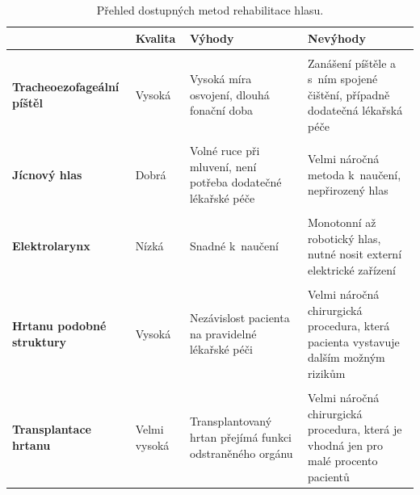 \newcolumntype{b}{X}

\begin{table}[ht]
  \centering
  \begin{tabularx}{1.0\textwidth}{L{1.2} L{0.6} L{1.1} L{1.1}}
    & \textbf{Kvalita} & \textbf{Výhody} & \textbf{Nevýhody} \\
    \toprule \\ [-1.75ex]

    \textbf{Tracheoezofageální píštěl} & Vysoká & Vysoká míra osvojení, dlouhá fonační doba & Zanášení píštěle a s~ním spojené čištění, případně dodatečná lékařská péče \\
    \midrule \\ [-1.75ex]

    \textbf{Jícnový hlas} & Dobrá & Volné ruce při mluvení, není potřeba dodatečné lékařské péče & Velmi náročná metoda  k~naučení, nepřirozený hlas \\
    \midrule \\ [-1.75ex]

    \textbf{Elektrolarynx} & Nízká & Snadné  k~naučení & Monotonní až robotický hlas, nutné nosit externí elektrické zařízení \\
    \midrule \\ [-1.75ex]

    \textbf{Hrtanu podobné struktury} & Vysoká & Nezávislost pacienta na pravidelné lékařské péči & Velmi náročná chirurgická procedura, která pacienta vystavuje dalším možným rizikům  \\
    \midrule \\ [-1.75ex]

    \textbf{Transplantace hrtanu} & Velmi vysoká & Transplantovaný hrtan přejímá funkci odstraněného orgánu & Velmi náročná chirurgická procedura, která je vhodná jen pro malé procento pacientů \\
  \end{tabularx}

  \caption{Přehled dostupných metod rehabilitace hlasu. \label{tab:treatment:summary}}
\end{table}

